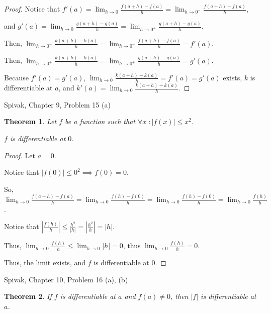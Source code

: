 \documentclass{article} %
\theoremstyle{plain}
\newtheorem*{theorem*}{Theorem}
\theoremstyle{definition}
\begin{document}
\begin{proof}
    Notice that $f'(a) = \lim_{h \to 0} \frac{f(a+h) - f(a)}{h} = \lim_{h \to 0^-} \frac{f(a+h) - f(a)}{h}$,

    and $g'(a) = \lim_{h \to 0} \frac{g(a+h) - g(a)}{h} = \lim_{h \to 0^+} \frac{g(a+h) - g(a)}{h}$.

    Then, $\lim_{h \to 0^-} \frac{k(a+h) - k(a)}{h} = \lim_{h \to 0^-} \frac{f(a+h) - f(a)}{h} = f'(a)$.

    Then, $\lim_{h \to 0^+} \frac{k(a+h) - k(a)}{h} = \lim_{h \to 0^+} \frac{g(a+h) - g(a)}{h} = g'(a)$.

    Because $f'(a) = g'(a)$, $\lim_{h \to 0} \frac{k(a+h) - k(a)}{h} = f'(a) = g'(a)$ exists, $k$ is differentiable at $a$, and $k'(a) = \lim_{h \to 0} \frac{k(a+h) - k(a)}{h}$.
\end{proof}

  \noindent{} Spivak, Chapter 9, Problem 15 (a) 

\begin{theorem*} 
    Let $f$ be a function such that $\forall x \; \colon |f(x)| \leq x^2$.

    $f$ is differentiable at $0$.
\end{theorem*}
  
\begin{proof} 
    Let $a = 0$.

    Notice that $|f(0)| \leq 0^2 \implies f(0) = 0$.

    So, $\lim_{h \to 0} \frac{f(a+h) - f(a)}{h} = \lim_{h \to 0} \frac{f(h) - f(0)}{h} = \lim_{h \to 0} \frac{f(h) - f(0)}{h} = \lim_{h \to 0} \frac{f(h)}{h}$. 

    Notice that $|\frac{f(h)}{h}| \leq \frac{h^2}{|h|} = |\frac{h^2}{h}| = |h|$.

    Thus, $\lim_{h \to 0} \frac{f(h)}{h} \leq \lim_{h \to 0} |h| = 0$, thus $\lim_{h \to 0} \frac{f(h)}{h} = 0$.

    Thus, the limit exists, and $f$ is differentiable at $0$.
\end{proof}
  
    \noindent{} Spivak, Chapter 10, Problem 16 (a), (b)

\begin{theorem*} 
    If $f$ is differentiable at $a$ and $f(a) \neq 0$, then $|f|$ is differentiable at $a$.
\end{theorem*}
  
\end{document}
